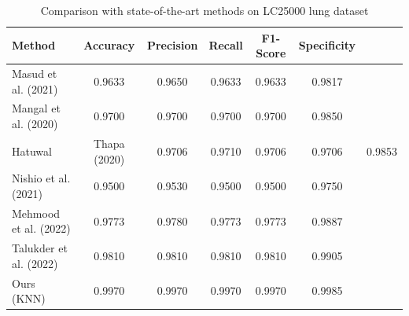 \begin{table}[htbp]
\centering
\caption{Comparison with state-of-the-art methods on LC25000 lung dataset}
\label{tab:table3}
\begin{tabular}{lccccc}
\toprule
Method & Accuracy & Precision & Recall & F1-Score & Specificity \\
\midrule
Masud et al. (2021) & 0.9633 & 0.9650 & 0.9633 & 0.9633 & 0.9817 \\
Mangal et al. (2020) & 0.9700 & 0.9700 & 0.9700 & 0.9700 & 0.9850 \\
Hatuwal & Thapa (2020) & 0.9706 & 0.9710 & 0.9706 & 0.9706 & 0.9853 \\
Nishio et al. (2021) & 0.9500 & 0.9530 & 0.9500 & 0.9500 & 0.9750 \\
Mehmood et al. (2022) & 0.9773 & 0.9780 & 0.9773 & 0.9773 & 0.9887 \\
Talukder et al. (2022) & 0.9810 & 0.9810 & 0.9810 & 0.9810 & 0.9905 \\
Ours (KNN) & 0.9970 & 0.9970 & 0.9970 & 0.9970 & 0.9985 \\
\bottomrule
\end{tabular}
\end{table}